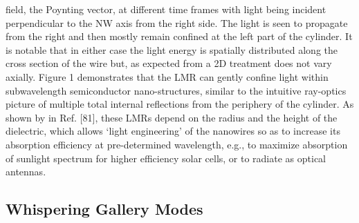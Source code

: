 field, the Poynting vector, at different time frames with light being incident
perpendicular to the NW axis from the right side. The light is seen to
propagate from the right and then mostly remain confined at the left part of
the cylinder. It is notable that in either case the light energy is spatially
distributed along the cross section of the wire but, as expected from a 2D
treatment does not vary axially. Figure 1 demonstrates that the LMR can gently
confine light within subwavelength semiconductor nano-structures, similar to
the intuitive ray-optics picture of multiple total internal reflections from
the periphery of the cylinder. As shown by in Ref. [81], these LMRs depend on
the radius and the height of the dielectric, which allows ‘light engineering’
of the nanowires so as to increase its absorption efficiency at pre-determined
wavelength, e.g., to maximize absorption of sunlight spectrum for  higher
efficiency solar cells, or to radiate as optical antennas. 

\subsection{Whispering Gallery Modes}
\label{sec:host}


